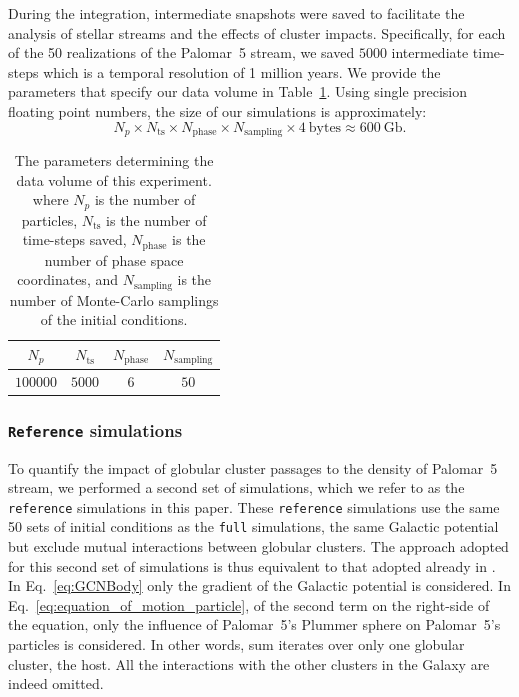 \documentclass{aa}
\begin{document}
      During the integration, intermediate snapshots were saved to facilitate the analysis of stellar streams and the effects of cluster impacts. Specifically, for each of the 50 realizations of the Palomar~5 stream, we saved $5000$ intermediate time-steps which is a temporal resolution of 1 million years. We provide the parameters that specify our data volume in Table~\ref{tab:data_volume}. Using single precision floating point numbers, the size of our simulations is approximately:
    \begin{equation} \label{eq:data_volume_estimate}
      N_p \times N_{\textrm{ts}}\times N_{\textrm{phase}}\times N_{\textrm{sampling}} \times 4~\textrm{bytes}\approx 600~\textrm{Gb}.
    \end{equation}

    \begin{table}[h]
      \centering
      \begin{tabular}{|c|c|c|c|}
          \hline
          $N_p$ & $N_{\textrm{ts}}$ & $N_{\textrm{phase}}$ & $N_{\textrm{sampling}}$ \\
          \hline
          $100000$ & $5000$ & $6$ & $50$ \\
          \hline
      \end{tabular}
      \caption{The parameters determining the data volume of this experiment. where $N_p$  is the number of particles, $N_{\textrm{ts}}$ is the number of time-steps saved, $N_{\textrm{phase}}$ is the number of phase space coordinates, and $N_{\textrm{sampling}}$ is the number of Monte-Carlo samplings of the initial conditions.}
      \label{tab:data_volume}
    \end{table}

  \subsubsection*{ \texttt{Reference} simulations}

    To quantify the impact of globular cluster passages to the density of Palomar~5 stream, we performed a second set of simulations, which we refer to as the \texttt{reference} simulations in this paper.  These \texttt{reference} simulations use the same 50 sets of initial conditions as the \texttt{full} simulations, the same Galactic potential but exclude mutual interactions between globular clusters. The approach adopted for this second set of simulations is thus equivalent to that adopted already in \citet{2023A&A...673A..44F}. In Eq.~\ref{eq:GCNBody} only the gradient of the Galactic potential  is considered. In Eq.~\ref{eq:equation_of_motion_particle}, of the second term on the right-side of the equation, only the influence of Palomar~5's Plummer sphere on Palomar~5's particles is considered. In other words, sum iterates over only one globular cluster, the host. All the interactions with the other clusters in the Galaxy are indeed omitted.
\end{document}
